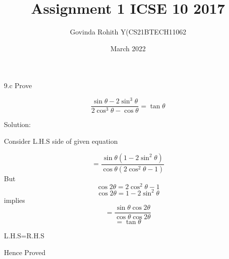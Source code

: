 \documentclass{article}
\title{Assignment 1 ICSE 10 2017}
\author{Govinda Rohith Y(CS21BTECH11062}
\date{March 2022}
\begin{document}
\maketitle

9.c Prove 

\begin{equation*}
\frac{\sin\theta-2\sin^3\theta}{2\cos^3\theta-\cos\theta}=\tan\theta
\end{equation*}
\large

Solution: 

\normalsize
\begin{flushleft}
Consider L.H.S side of given equation
\end{flushleft}


\begin{equation}
=\frac{\sin\theta(1-2\sin^2\theta)}{\cos\theta(2\cos^2\theta-1)}
\end{equation}
But
\begin{equation}
\cos2\theta=2\cos^2\theta-1 
\end{equation}
\begin{equation}
    \cos2\theta=1-2\sin^2\theta
\end{equation}
implies
\begin{equation}
    =\frac{\sin\theta \cos2\theta}{\cos\theta \cos2\theta}
\end{equation}
\begin{equation}
    =\tan\theta
\end{equation}
\begin{center}
    L.H.S=R.H.S
    
    Hence Proved
\end{center}
\end{document}
